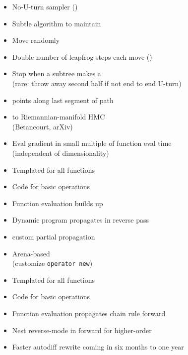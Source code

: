 \documentclass[10pt]{report}
\newcommand{\sld}[1]{\newpage{\noindent\LARGE \ \ \
    \textcolor{MidnightBlue}{\bfseries #1}}\vspace*{4pt}}
\newcommand{\code}[1]{{\tt #1}}
\newcommand{\myemph}[1]{{\color{MidnightBlue}{\bfseries #1}}}
\begin{document}
\sld{Adapting HMC During Sampling}

\begin{itemize}
\item No-U-turn sampler (\myemph{NUTS})
\item Subtle algorithm to maintain \myemph{detailed balance}
\item Move randomly \myemph{forward or backward in time}
\item Double number of leapfrog steps each move (\myemph{binary tree})
\item Stop when a subtree makes a \myemph{U-turn}
\\ {\footnotesize (rare: throw away second half if not end to end U-turn)}
\item \myemph{Slice sample} points along last segment of path
\item \myemph{Generalized} to Riemannian-manifold HMC
\\ {\footnotesize (Betancourt, arXiv)}
\end{itemize}

\sld{Reverse-Mode Auto Diff}
\begin{itemize}
\item Eval gradient in small multiple of function eval time
\\
{\footnotesize (independent of dimensionality)}
\item Templated \myemph{C++ overload} for all functions
\item Code \myemph{partial derivatives} for basic operations
\item Function evaluation builds up \myemph{expression tree}
\item Dynamic program propagates \myemph{chain rule} in reverse pass
\item \myemph{Object-oriented} custom partial propagation
\item Arena-based \myemph{memory management}
\\ {\footnotesize (customize \code{operator new})}
\end{itemize}

\sld{Forward-Mode Auto Diff}
\begin{itemize}
\item Templated \myemph{C++ overload} for all functions
\item Code \myemph{partial derivatives} for basic operations
\item Function evaluation propagates chain rule forward
\item Nest reverse-mode in forward for higher-order
\vfill
\item Faster autodiff rewrite coming in six months to one year
\end{itemize}
\end{document}
